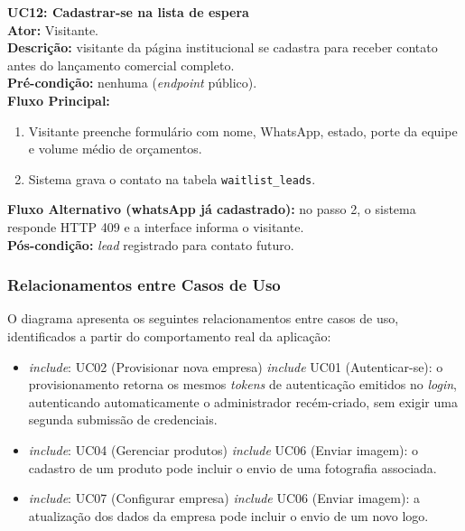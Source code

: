 \medskip
\noindent\textbf{UC12: Cadastrar-se na lista de espera}\\
\textbf{Ator:} Visitante.\\
\textbf{Descrição:} visitante da página institucional se cadastra para receber contato antes do lançamento comercial completo.\\
\textbf{Pré-condição:} nenhuma (\textit{endpoint} público).\\
\textbf{Fluxo Principal:}
\begin{enumerate}
  \item Visitante preenche formulário com nome, WhatsApp, estado, porte da equipe e volume médio de orçamentos.
  \item Sistema grava o contato na tabela \texttt{waitlist\_leads}.
\end{enumerate}
\textbf{Fluxo Alternativo (whatsApp já cadastrado):} no passo 2, o sistema responde HTTP 409 e a interface informa o visitante.\\
\textbf{Pós-condição:} \textit{lead} registrado para contato futuro.

\subsubsection{Relacionamentos entre Casos de Uso}
\label{sec:relacionamentos-casos-uso}

O diagrama apresenta os seguintes relacionamentos entre casos de uso, identificados a partir do comportamento real da aplicação:

\begin{itemize}
\item \textit{\guillemotleft include\guillemotright}: UC02 (Provisionar nova empresa) \textit{\guillemotleft include\guillemotright} UC01 (Autenticar-se): o provisionamento retorna os mesmos \textit{tokens} de autenticação emitidos no \textit{login}, autenticando automaticamente o administrador recém-criado, sem exigir uma segunda submissão de credenciais.
\item \textit{\guillemotleft include\guillemotright}: UC04 (Gerenciar produtos) \textit{\guillemotleft include\guillemotright} UC06 (Enviar imagem): o cadastro de um produto pode incluir o envio de uma fotografia associada.
\item \textit{\guillemotleft include\guillemotright}: UC07 (Configurar empresa) \textit{\guillemotleft include\guillemotright} UC06 (Enviar imagem): a atualização dos dados da empresa pode incluir o envio de um novo logo.
\end{itemize}

